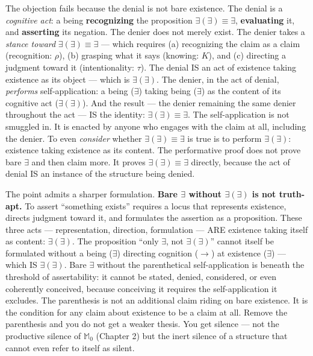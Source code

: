 \documentclass[10pt, openany, oneside]{book}
\begin{document}
The objection fails because the denial is not bare existence. The denial is a \textit{cognitive act}: a being \textbf{recognizing} the proposition $\exists(\exists) \equiv \exists$, \textbf{evaluating} it, and \textbf{asserting} its negation. The denier does not merely exist. The denier takes a \textit{stance toward} $\exists(\exists) \equiv \exists$ --- which requires (a) recognizing the claim as a claim (recognition: $\rho$), (b) grasping what it says (knowing: $K$), and (c) directing a judgment toward it (intentionality: $\tau$). The denial IS an act of existence taking existence as its object --- which is $\exists(\exists)$. The denier, in the act of denial, \textit{performs} self-application: a being ($\exists$) taking being ($\exists$) as the content of its cognitive act ($\exists(\exists)$). And the result --- the denier remaining the same denier throughout the act --- IS the identity: $\exists(\exists) \equiv \exists$. The self-application is not smuggled in. It is enacted by anyone who engages with the claim at all, including the denier. To even \textit{consider} whether $\exists(\exists) \equiv \exists$ is true is to perform $\exists(\exists)$: existence taking existence as its content. The performative proof does not prove bare $\exists$ and then claim more. It proves $\exists(\exists) \equiv \exists$ directly, because the act of denial IS an instance of the structure being denied.

The point admits a sharper formulation. \textbf{Bare $\exists$ without $\exists(\exists)$ is not truth-apt.} To assert ``something exists'' requires a locus that represents existence, directs judgment toward it, and formulates the assertion as a proposition. These three acts --- representation, direction, formulation --- ARE existence taking itself as content: $\exists(\exists)$. The proposition ``only $\exists$, not $\exists(\exists)$'' cannot itself be formulated without a being ($\exists$) directing cognition ($\to$) at existence ($\exists$) --- which IS $\exists(\exists)$. Bare $\exists$ without the parenthetical self-application is beneath the threshold of assertability: it cannot be stated, denied, considered, or even coherently conceived, because conceiving it requires the self-application it excludes. The parenthesis is not an additional claim riding on bare existence. It is the condition for any claim about existence to be a claim at all. Remove the parenthesis and you do not get a weaker thesis. You get silence --- not the productive silence of $\mathbb{M}_0$ (Chapter 2) but the inert silence of a structure that cannot even refer to itself as silent.
\end{document}
